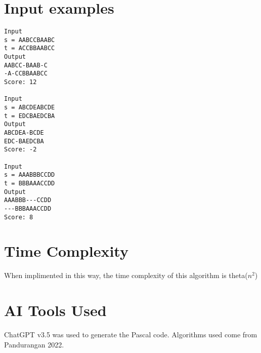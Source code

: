 \documentclass[conference]{IEEEtran}
\begin{document}
\section{Input examples}

\begin{verbatim}
Input
s = AABCCBAABC
t = ACCBBAABCC
Output
AABCC-BAAB-C
-A-CCBBAABCC
Score: 12

Input
s = ABCDEABCDE
t = EDCBAEDCBA
Output
ABCDEA-BCDE
EDC-BAEDCBA
Score: -2

Input
s = AAABBBCCDD
t = BBBAAACCDD
Output
AAABBB---CCDD
---BBBAAACCDD
Score: 8

\end{verbatim}

\section{Time Complexity}
When implimented in this way, the time complexity of this algorithm is theta($n^2$)

\section{AI Tools Used}
ChatGPT v3.5 was used to generate the Pascal code. Algorithms used come from Pandurangan 2022.
\end{document}
